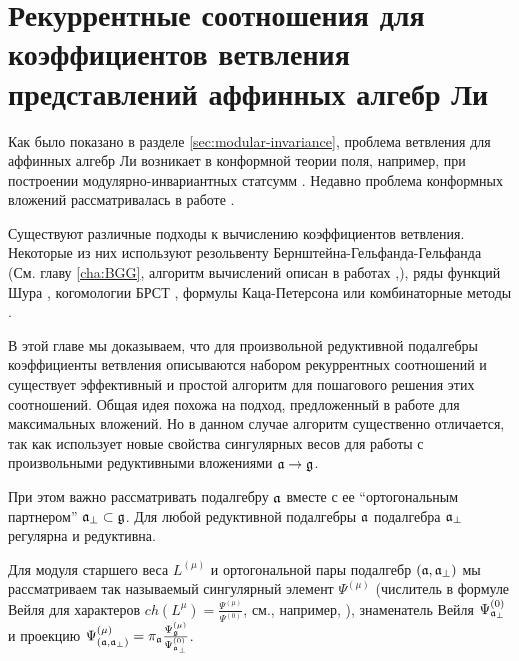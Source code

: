 
\chapter{Рекуррентные соотношения для коэффициентов ветвления представлений аффинных алгебр Ли}
\label{cha:affine-lie-algebras}

Как было показано в разделе \ref{sec:modular-invariance}, проблема ветвления для аффинных алгебр Ли возникает в конформной теории поля, например, при построении модулярно-инвариантных статсумм  \cite{difrancesco1997cft}. Недавно проблема конформных вложений рассматривалась в работе \cite{coquereaux2008conformal}.

Существуют различные подходы к вычислению коэффициентов ветвления. Некоторые из них используют резольвенту Бернштейна-Гельфанда-Гельфанда \cite{bernstein1975differential} (См. главу \ref{cha:BGG}, алгоритм вычислений описан в работах \cite{kac1990idl},\cite{wakimoto2001idl}), ряды функций Шура \cite{fauser2006new}, когомологии БРСТ  \cite{Hwang:1994yr}, формулы Каца-Петерсона  \cite{kac1990idl,quella2002branching} или комбинаторные методы \cite{feigin707principal}.

В этой главе мы доказываем, что для произвольной редуктивной подалгебры коэффициенты ветвления описываются набором рекуррентных соотношений и существует эффективный и простой алгоритм для пошагового решения этих соотношений. Общая идея похожа на подход, предложенный в работе  \cite{ilyin812pbc} для максимальных вложений. Но в данном случае алгоритм существенно отличается, так как использует новые свойства сингулярных весов для работы с произвольными редуктивными вложениями $\mathfrak{a} \rightarrow \mathfrak{g}$.

При этом важно рассматривать подалгебру  $\mathfrak{a}$ вместе с ее ``ортогональным партнером'' $\mathfrak{a}_{\perp}\subset \mathfrak{g}$. 
Для любой редуктивной подалгебры $\mathfrak{a}$ подалгебра $\mathfrak{a}_{\perp}$ регулярна и редуктивна. 

Для модуля старшего веса  $L^{\left( \mu \right)}$ и ортогональной пары подалгебр $\left(  \mathfrak{a}, \mathfrak{a}_{\perp} \right)$ мы рассматриваем так называемый сингулярный элемент  $\Psi^{\left( \mu \right)}$ (числитель в формуле Вейля для характеров
$ch\left( L^{\mu }\right) =\frac{\Psi ^{\left( \mu \right) }}{\Psi ^{\left( 0\right) }}$,
см., например, \cite{humphreys1997introduction}), 
знаменатель Вейля $\Psi ^{\left( 0\right) }_{\mathfrak{a}_{\perp}}$ и проекцию
$\Psi ^{\left( \mu \right) }_{\left(  \mathfrak{a}, \mathfrak{a}_{\perp} \right)}
=\pi_{\mathfrak{a}}\frac{\Psi ^{\left( \mu \right) }_{\mathfrak{g}}}{\Psi ^{\left( 0\right) }_{\mathfrak{a}_{\perp}}}$.

